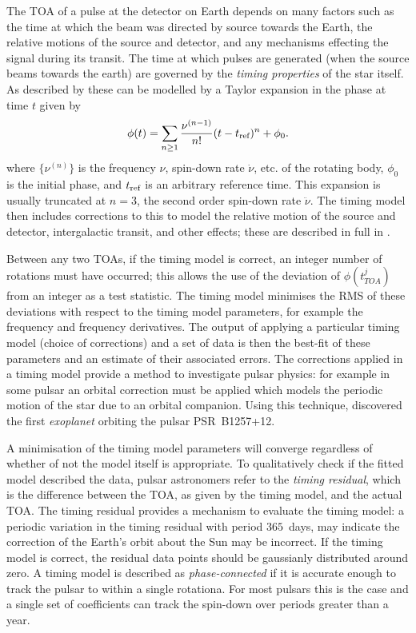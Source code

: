 The TOA of a pulse at the detector on Earth depends on many factors such as the
time at which the beam was directed by source towards the Earth, the relative
motions of the source and detector, and any mechanisms effecting the signal during
its transit. The time at which pulses are generated (when the source beams towards
the earth) are governed by the \emph{timing properties} of the star itself.
As described by \citet{Edwards2006} these can be modelled by a Taylor expansion
in the phase at time $t$ given by
\begin{equation}
\phi(t) = \sum_{n\ge 1}\frac{\nu^{(n-1)}}{n!}(t - t_{\textrm{ref}})^{n} + \phi_{0}.
\label{eqn: Taylor compact}
\end{equation} 
where $\{\nu^{(n)}\}$ is the frequency $\nu$, spin-down rate $\dot{\nu}$, etc.
of the rotating body, $\phi_0$ is the initial phase, and $t_{\textrm{ref}}$ is an
arbitrary reference time. This expansion is usually truncated at $n=3$, the
second order spin-down rate $\ddot{\nu}$. The timing model then includes
corrections to this to model the relative motion of the source and detector,
intergalactic transit, and other effects; these are described in full in
\citet{Edwards2006}. 

Between any two TOAs, if the timing model is correct, an integer number of
rotations must have occurred; this allows the use of the deviation of
$\phi(t_{TOA}^{j})$ from an integer as a test statistic. The timing model
minimises the RMS of these deviations with respect to the timing model
parameters, for example the frequency and frequency derivatives. The output of
applying a particular timing model (choice of corrections) and a set of data is
then the best-fit of these parameters and an estimate of their associated
errors.  The corrections applied in a timing model provide a method to
investigate pulsar physics: for example in some pulsar an orbital correction
must be applied which models the periodic motion of the star due to an orbital
companion. Using this technique, \citet{wolszczan1992planetary} discovered the
first \emph{exoplanet} orbiting the pulsar PSR~B1257+12.

A minimisation of the timing model parameters will converge regardless of
whether of not the model itself is appropriate. To qualitatively check if the
fitted model described the data, pulsar astronomers refer to the \emph{timing
residual}, which is the difference between the TOA, as given by the timing
model, and the actual TOA. The timing residual provides a mechanism to evaluate
the timing model: a periodic variation in the timing residual with period
$365$~days, may indicate the correction of the Earth's orbit about the Sun may
be incorrect. If the timing model is correct, the residual data points should
be gaussianly distributed around zero. A timing model is described as
\emph{phase-connected} if it is accurate enough to track the pulsar to within a
single rotationa.  For most pulsars this is the case and a single set of
coefficients can track the spin-down over periods greater than a year.

